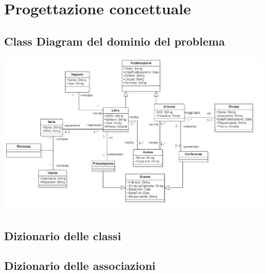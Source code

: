 \chapter{Progettazione concettuale}
    \section{Class Diagram del dominio del problema}

    \includegraphics[scale=0.25, center]{Immagini/CD_dominio_del_problema.png}
        
    \section{Dizionario delle classi}
        
    \section{Dizionario delle associazioni}